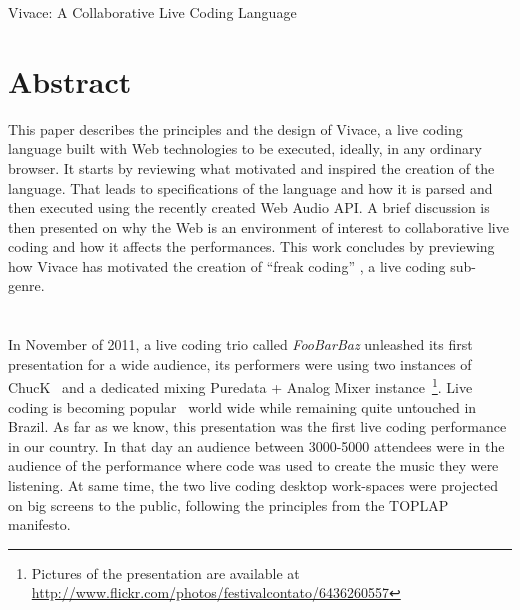 \documentclass[letterpaper, 12pt]{article}
\begin{document}

\vspace*{24pt}


 {\cmjTitle Vivace: A Collaborative Live Coding Language}


\section*{Abstract}

This paper describes the principles and the design of Vivace, a live
coding language built with Web technologies to be executed, ideally, in
any ordinary browser. It starts by reviewing what motivated and
inspired the creation of the language. That leads to specifications of
the language and how it is parsed and then executed using the recently
created Web Audio API. A brief discussion is then presented on why the Web
is an environment of interest to collaborative live coding and how it
affects the performances. This work concludes by previewing how
Vivace has motivated the creation of ``freak coding'' , a live coding
sub-genre.

\section*{} %

In November of 2011, a live coding trio called \textit{FooBarBaz}
unleashed its first presentation for a wide audience, its performers
were using two instances of ChucK~\citep*{wang2003chuck} and a
dedicated mixing Puredata + Analog Mixer instance~\footnote{Pictures
  of the presentation are available at
  \url{http://www.flickr.com/photos/festivalcontato/6436260557}}. Live
coding is becoming popular~\citep*{nilson2007live} world wide while
remaining quite untouched in Brazil. As far as we know, this
presentation was the first live coding performance in our country. In
that day an audience between 3000-5000 attendees were in the audience
of the performance where code was used to create the music they were
listening. At same time, the two live coding desktop work-spaces were
projected on big screens to the public, following the principles from
the TOPLAP~\citep*{ward2004live} manifesto.
\end{document}
